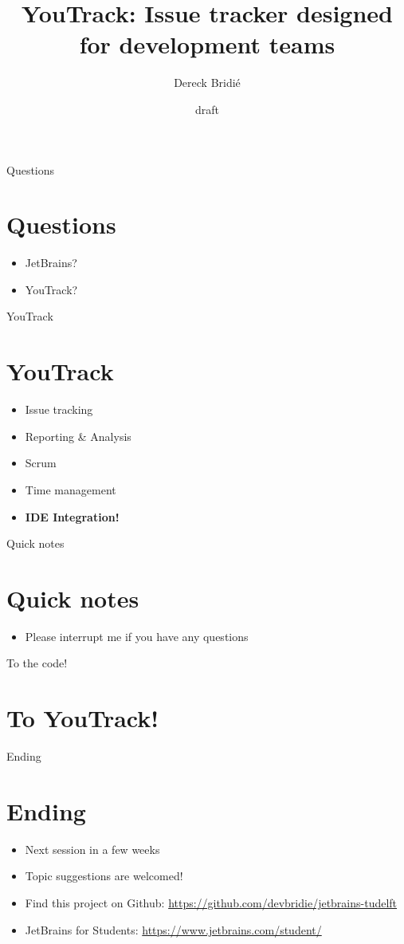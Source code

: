 \documentclass{beamer}
\title{YouTrack: Issue tracker designed for development teams}
\author{Dereck Bridi\'e}
\date{draft}
\begin{document}
\begin{frame}
\maketitle
\end{frame}

\begin{frame}{Questions}
\section{Questions}
\begin{itemize}
    \item JetBrains?
    \item YouTrack?
\end{itemize}
\end{frame}

\begin{frame}{YouTrack}
\section{YouTrack}
\begin{itemize}
    \item Issue tracking
    \item Reporting \& Analysis
	\item Scrum
	\item Time management
	\item \textbf{IDE Integration!}
\end{itemize}
\end{frame}

\begin{frame}{Quick notes}
\section{Quick notes}
\begin{itemize}
    \item Please interrupt me if you have any questions
\end{itemize}
\end{frame}

\begin{frame}{To the code!}
\section{To YouTrack!}
\end{frame}

\begin{frame}{Ending}
\section{Ending}
\begin{itemize}
    \item Next session in a few weeks
    \item Topic suggestions are welcomed!
    \item Find this project on Github: \url{https://github.com/devbridie/jetbrains-tudelft}
    \item JetBrains for Students: \url{https://www.jetbrains.com/student/}
\end{itemize}
\end{frame}
\end{document}
